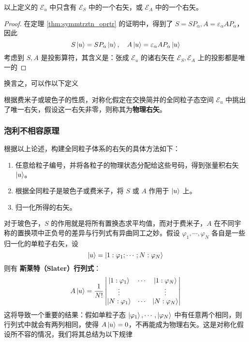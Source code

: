 \documentclass[cn,10pt,math=newtx,citestyle=gb7714-2015,bibstyle=gb7714-2015]{elegantbook}
\def\ms{\mathscr}
\def\vphi{\varphi}
\def\ve{\varepsilon}
\begin{document}
\begin{theorem}[对称化假定消除交换简并]
    以上定义的 $\ms E_u$ 中只含有 $\ms E_S$ 中的一个右矢，或 $\ms E_A$ 中的一个右矢。
\end{theorem}
\begin{proof}
    在定理 \ref{thm:symmtrztn_oprtr} 的证明中，得到了 $S=SP_\alpha,A =\ve_\alpha AP_\alpha$，因此
    \begin{equation}
        S\ket{u} = SP_\alpha\ket{u},\quad A\ket{u} = \ve_\alpha AP_\alpha\ket{u}
    \end{equation}
    考虑到 $S,A$ 是投影算符，其含义是：张成 $\ms E_u$ 的诸右矢在 $\ms E_S,\ms E_A$ 上的投影都是唯一的
\end{proof}

换言之，可以作以下定义
\begin{definition}[物理右矢]
    根据费米子或玻色子的性质，对称化假定在交换简并的全同粒子态空间 $\ms E_u$ 中挑出了唯一右矢，假设这一右矢非零，则称其为\textbf{物理右矢}。
\end{definition}

\subsubsection{泡利不相容原理}

根据以上论述，构建全同粒子体系的右矢的具体方法如下：
\begin{enumerate}
    \item 任意给粒子编号，并将各粒子的物理状态分配给这些号码，得到张量积右矢 $\ket{u}$。
    \item 根据全同粒子是玻色子或费米子，将 $S$ 或 $A$ 作用于 $\ket{u}$ 上。
    \item 归一化所得的右矢。
\end{enumerate}

对于玻色子，$S$ 的作用就是将所有置换态求平均值，而对于费米子，$A$ 在不同宇称的置换项中正负号的差异与行列式有异曲同工之妙。假设 $\vphi_1,\cdots,\vphi_N$ 各自是一些归一化的单粒子右矢，设
\begin{equation}
    \ket{u} = \ket{1:\vphi_1;\cdots;N:\vphi_N}
\end{equation}
则有 \textbf{斯莱特（Slater）行列式}：
\begin{equation}
    A\ket{u} = \frac{1}{N!}\begin{vmatrix}\ket{1:\vphi_1} & \cdots & \ket{1:\vphi_N}\\ \vdots & & \vdots \\ \ket{N:\vphi_1} & \cdots & \ket{N:\vphi_N}
    \end{vmatrix}
\end{equation}
这将导致一个重要的结果：假如单粒子态 $\ket{\vphi_1},\cdots,\ket{\vphi_N}$
中有任意两个相同，则行列式中就会有两列相同，使得 $A\ket{u} =0$，不再能成为物理右矢。这是对称化假设所不容的情况，我们将其总结为以下规律
\end{document}
